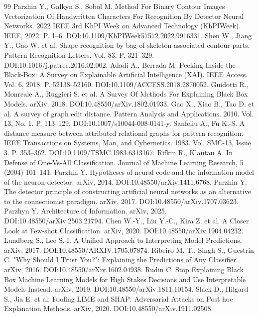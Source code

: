 \documentclass[conference]{IEEEtran}
\begin{document}
\begin{thebibliography}{99}
 Parzhin Y., Galkyn S., Sobol M. Method For Binary Contour Images Vectorization Of Handwritten Characters For Recognition By Detector Neural Networks. 2022 IEEE 3rd KhPI Week on Advanced Technology (KhPIWeek). IEEE, 2022. P. 1--6. DOI:10.1109/KhPIWeek57572.2022.9916331.
 Shen W., Jiang Y., Gao W. et al. Shape recognition by bag of skeleton-associated contour parts. Pattern Recognition Letters. Vol. 83. P. 321--329. DOI:10.1016/j.patrec.2016.02.002.
 Adadi A., Berrada M. Peeking Inside the Black-Box: A Survey on Explainable Artificial Intelligence (XAI). IEEE Access. Vol. 6, 2018. P. 52138--52160. DOI:10.1109/ACCESS.2018.2870052.
 Guidotti R., Monreale A., Ruggieri S. et al. A Survey Of Methods For Explaining Black Box Models. arXiv, 2018. DOI:10.48550/arXiv.1802.01933.
 Gao X., Xiao B., Tao D. et al. A survey of graph edit distance. Pattern Analysis and Applications. 2010. Vol. 13, No. 1. P. 113--129. DOI:10.1007/s10044-008-0141-y.
 Sanfeliu A., Fu K.-S. A distance measure between attributed relational graphs for pattern recognition. IEEE Transactions on Systems, Man, and Cybernetics. 1983. Vol. SMC-13, Issue 3. P. 353--362. DOI:10.1109/TSMC.1983.6313167.
 Rifkin R., Klautau A. In Defense of One-Vs-All Classification. Journal of Machine Learning Research, 5 (2004) 101–141.
 Parzhin Y. Hypotheses of neural code and the information model of the neuron-detector. arXiv, 2014. DOI:10.48550/arXiv.1411.6768.
 Parzhin Y. The detector principle of constructing artificial neural networks as an alternative to the connectionist paradigm. arXiv, 2017. DOI:10.48550/arXiv.1707.03623.
 Parzhyn Y. Architecture of Information. arXiv, 2025. DOI:10.48550/arXiv.2503.21794.
 Chen W.-Y., Liu Y.-C., Kira Z. et al. A Closer Look at Few-shot Classification. arXiv, 2020. DOI:10.48550/arXiv.1904.04232.
 Lundberg S., Lee S.-I. A Unified Approach to Interpreting Model Predictions. arXiv, 2017. DOI:10.48550/ARXIV.1705.07874.
 Ribeiro M. T., Singh S., Guestrin C. "Why Should I Trust You?": Explaining the Predictions of Any Classifier. arXiv, 2016. DOI:10.48550/arXiv.1602.04938.
 Rudin C. Stop Explaining Black Box Machine Learning Models for High Stakes Decisions and Use Interpretable Models Instead. arXiv, 2019. DOI:10.48550/arXiv.1811.10154.
 Slack D., Hilgard S., Jia E. et al. Fooling LIME and SHAP: Adversarial Attacks on Post hoc Explanation Methods. arXiv, 2020. DOI:10.48550/arXiv.1911.02508.

\end{thebibliography}
\end{document}
